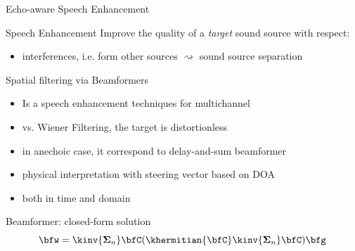 \begin{frame}{Echo-aware Speech Enhancement}
    \begin{block}{Speech Enhancement}
        Improve the quality of a \textit{target} sound source with respect:
        \begin{itemize}
            \item interferences, i.e. form other sources $\rightsquigarrow$ sound source separation
        \end{itemize}
    \end{block}

    \begin{block}{Spatial filtering via Beamformers}
        \begin{itemize}
            \item Is a speech enhancement techniques for multichannel
            \item vs. Wiener Filtering, the target is distortionless
            \item in anechoic case, it correspond to delay-and-sum beamformer
            \item physical interpretation with steering vector based on DOA
            \item both in time and  domain
        \end{itemize}
    \end{block}

    \begin{mydefblock}{Beamformer: closed-form solution}
        \begin{equation*}
            \bfw = \kinv{\boldsymbol{\Sigma}_n} \bfC (\khermitian{\bfC} \kinv{\boldsymbol{\Sigma}_n} \bfC) \bfg
        \end{equation*}
    \end{mydefblock}


\end{frame}

